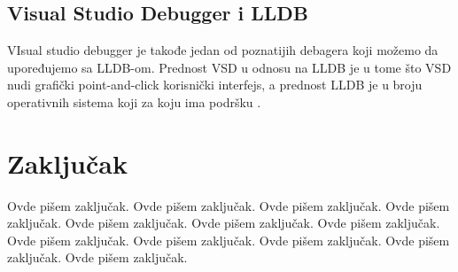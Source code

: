 \documentclass[a4paper]{article}
\begin{document}
\subsection{Visual Studio Debugger i LLDB}
\label{subsec: Visual Studio Debugger i LLDB}

VIsual studio debugger je takođe jedan od poznatijih debagera koji možemo da upoređujemo sa LLDB-om. Prednost VSD u odnosu na LLDB je u tome što VSD nudi grafički point-and-click korisnički interfejs, a prednost LLDB je u broju operativnih sistema koji za koju ima podršku \cite{vsd}.

\section{Zaključak}
\label{sec:zakljucak}

Ovde pišem zaključak. 
Ovde pišem zaključak. 
Ovde pišem zaključak. 
Ovde pišem zaključak. 
Ovde pišem zaključak. 
Ovde pišem zaključak. 
Ovde pišem zaključak. 
Ovde pišem zaključak. 
Ovde pišem zaključak. 
Ovde pišem zaključak. 
Ovde pišem zaključak. 
Ovde pišem zaključak. 


\appendix
 

\end{document}
